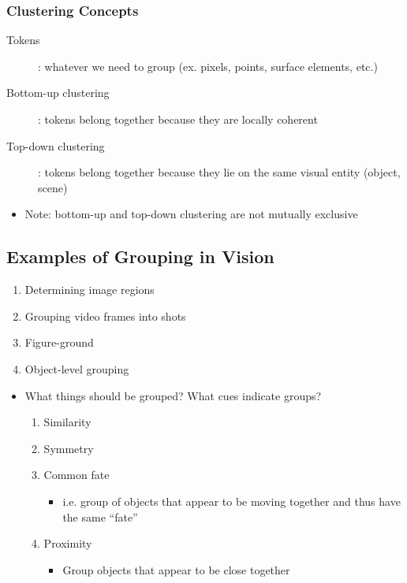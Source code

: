 \documentclass[letterpaper,12pt]{article}
\begin{document}
\subsubsection{Clustering Concepts}
\begin{description}
 \item[Tokens]: whatever we need to group (ex. pixels, points, surface elements, etc.)
 \item[Bottom-up clustering]: tokens belong together because they are locally coherent
 \item[Top-down clustering]: tokens belong together because they lie on the same visual entity (object, scene)
\end{description}
\begin{itemize}
 \item Note: bottom-up and top-down clustering are not mutually exclusive
\end{itemize}

\subsection{Examples of Grouping in Vision}
\begin{enumerate}
 \item Determining image regions
 \item Grouping video frames into shots
 \item Figure-ground
 \item Object-level grouping
\end{enumerate}
\begin{itemize}
 \item What things should be grouped? What cues indicate groups?
       \begin{enumerate}
        \item Similarity
        \item Symmetry
        \item Common fate
              \begin{itemize}
               \item i.e. group of objects that appear to be moving together and thus have the same ``fate''
              \end{itemize}
        \item Proximity
              \begin{itemize}
               \item Group objects that appear to be close together
              \end{itemize}
       \end{enumerate}
\end{itemize}
\end{document}

